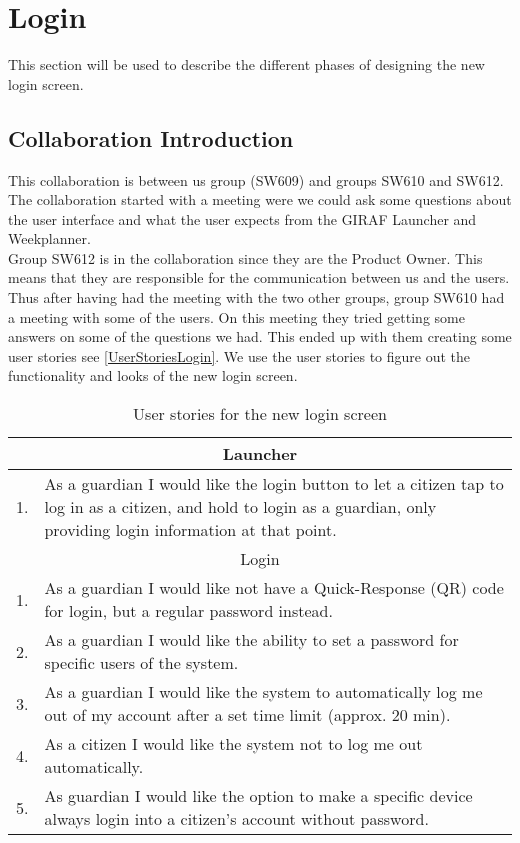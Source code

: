 \section{Login}\label{sec:LoginColab}
This section will be used to describe the different phases of designing the new
login screen.

\subsection{Collaboration Introduction}
This collaboration is between us group (SW609) and groups SW610 and SW612. The
collaboration started with a meeting were we could ask some questions about the
user interface and what the user expects from the GIRAF Launcher and
Weekplanner. \\
Group SW612 is in the collaboration since they are the Product Owner. This means
that they are responsible for the communication between us and the users. Thus
after having had the meeting with the two other groups, group SW610 had a
meeting with some of the users. On this meeting they tried getting some answers
on some of the questions we had. This ended up with them creating some user
stories see \autoref{UserStoriesLogin}. We use the user stories to figure out
the functionality and looks of the new login screen. 

\begin{table}[H]
\begin{tabular}{|c|p{12.5cm}|}
\hline 
\multicolumn{2}{|c|}{Launcher}\\
\hline
1. & As a guardian I would like the login button to let a citizen tap to log in
as a citizen, and hold to login as a guardian, only providing login information
at that point. \\ \hline
\multicolumn{2}{|c|}{Login}\\ \hline
1. & As a guardian I would like not have a Quick-Response (QR) code for login,
but a regular password instead.\\ \hline
2. & As a guardian I would like the ability to set a password for specific users
of the system.\\ \hline
3. & As a guardian I would like the system to automatically log me out of my
account after a set time limit (approx. 20 min).\\ \hline
4. & As a citizen I would like the system not to log me out automatically.\\ \hline
5. & As guardian I would like the option to make a specific device always login
into a citizen's account without password.\\ \hline
\end{tabular}
\caption{User stories for the new login screen}
\label{UserStoriesLogin}
\end{table}

